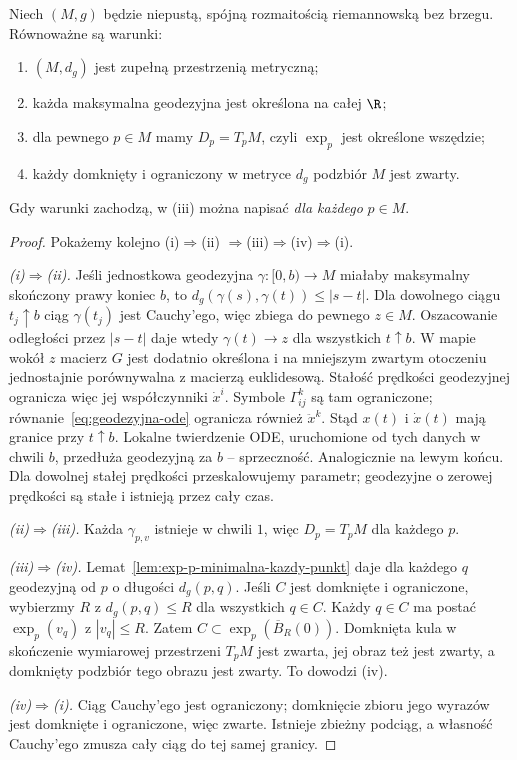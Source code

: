 \begin{twierdzenie}
\label{thm:hopf-rinow-geodezyjne}
Niech $(M,g)$ będzie niepustą, spójną rozmaitością
riemannowską bez brzegu. Równoważne są warunki:
\begin{enumerate}[label=(\roman*)]
\item $(M,d_g)$ jest zupełną przestrzenią metryczną;
\item każda maksymalna geodezyjna jest określona
      na całej $\R$;
\item dla pewnego $p\in M$ mamy $D_p=T_pM$,
      czyli $\exp_p$ jest określone wszędzie;
\item każdy domknięty i ograniczony w metryce
      $d_g$ podzbiór $M$ jest zwarty.
\end{enumerate}
Gdy warunki zachodzą, w (iii) można napisać
\emph{dla każdego} $p\in M$.
\end{twierdzenie}
\begin{proof}
Pokażemy kolejno (i)$\Rightarrow$(ii)
$\Rightarrow$(iii)$\Rightarrow$(iv)$\Rightarrow$(i).

\emph{(i)$\Rightarrow$(ii).}
Jeśli jednostkowa geodezyjna
$\gamma:[0,b)\to M$ miałaby maksymalny
skończony prawy koniec $b$, to
$d_g(\gamma(s),\gamma(t))\leq|s-t|$.
Dla dowolnego ciągu $t_j\uparrow b$ ciąg $\gamma(t_j)$
jest Cauchy'ego, więc zbiega do pewnego $z\in M$.
Oszacowanie odległości przez $|s-t|$ daje wtedy
$\gamma(t)\to z$ dla wszystkich $t\uparrow b$.
W mapie wokół $z$ macierz $G$ jest dodatnio
określona i na mniejszym zwartym otoczeniu
jednostajnie porównywalna z macierzą
euklidesową. Stałość prędkości geodezyjnej
ogranicza więc jej współczynniki $\dot x^i$.
Symbole $\Gamma^k_{ij}$ są tam ograniczone;
równanie~\eqref{eq:geodezyjna-ode} ogranicza
również $\ddot x^k$. Stąd $x(t)$ i $\dot x(t)$
mają granice przy $t\uparrow b$.
Lokalne twierdzenie ODE, uruchomione od tych
danych w chwili $b$, przedłuża geodezyjną
za $b$ -- sprzeczność. Analogicznie na lewym
końcu. Dla dowolnej stałej prędkości
przeskalowujemy parametr; geodezyjne o zerowej prędkości
są stałe i istnieją przez cały czas.

\emph{(ii)$\Rightarrow$(iii).}
Każda $\gamma_{p,v}$ istnieje w chwili $1$,
więc $D_p=T_pM$ dla każdego $p$.

\emph{(iii)$\Rightarrow$(iv).}
Lemat~\ref{lem:exp-p-minimalna-kazdy-punkt}
daje dla każdego $q$ geodezyjną od $p$
o długości $d_g(p,q)$. Jeśli $C$ jest domknięte
i ograniczone, wybierzmy $R$ z
$d_g(p,q)\leq R$ dla wszystkich $q\in C$.
Każdy $q\in C$ ma postać $\exp_p(v_q)$
z $|v_q|\leq R$. Zatem
$C\subset\exp_p(\overline B_R(0))$.
Domknięta kula w skończenie wymiarowej
przestrzeni $T_pM$ jest zwarta, jej obraz
też jest zwarty, a domknięty podzbiór
tego obrazu jest zwarty. To dowodzi (iv).

\emph{(iv)$\Rightarrow$(i).}
Ciąg Cauchy'ego jest ograniczony;
domknięcie zbioru jego wyrazów jest
domknięte i ograniczone, więc zwarte.
Istnieje zbieżny podciąg, a własność Cauchy'ego
zmusza cały ciąg do tej samej granicy.
\end{proof}

